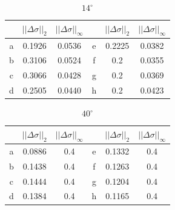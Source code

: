 \documentclass{procDDs}
\begin{document}
\begin{table}[h!]
	\begin{tabular}{|c|c|c||c|c|c|}
		\hline
		& $||\Delta\sigma||_2$ & $||\Delta\sigma||_\infty$ &
		& $||\Delta\sigma||_2$ & $||\Delta\sigma||_\infty$ \\ \hline
		a & 0.1926 & 0.0536 & e &  0.2225 & 0.0382\\ \hline
		b & 0.3106 & 0.0524 & f &  0.2 & 0.0355\\ \hline
		c & 0.3066 & 0.0428 & g &  0.2 & 0.0369\\ \hline
		d & 0.2505 & 0.0440 & h &  0.2 & 0.0423\\ \hline
	\end{tabular}
	\label{table:desc5}
	\caption{$14^\circ$}
\end{table}
\begin{table}[h!]
		\begin{tabular}{|c|c|c||c|c|c|}
			\hline
			& $||\Delta\sigma||_2$ & $||\Delta\sigma||_\infty$ &
			& $||\Delta\sigma||_2$ & $||\Delta\sigma||_\infty$ \\ \hline
			a & 0.0886 & 0.4 & e &  0.1332 & 0.4\\ \hline
			b & 0.1438 & 0.4 & f &  0.1263 & 0.4\\ \hline
			c & 0.1444 & 0.4 & g &  0.1204 & 0.4\\ \hline
			d & 0.1384 & 0.4 & h &  0.1165 & 0.4\\ \hline
	\end{tabular}
	\label{table:desc6}
	\caption{$40^\circ$}
\end{table}
 
\end{document}
